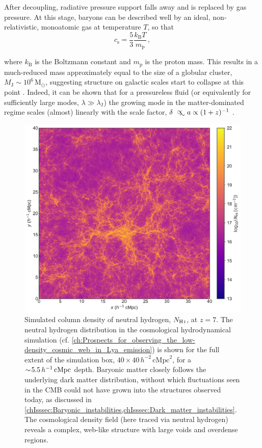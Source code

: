 After decoupling, radiative pressure support falls away and is replaced by gas pressure. At this stage, baryons can be described well by an ideal, non-relativistic, monoatomic gas at temperature $T$, so that
\begin{equation}
    \label{chIeq:Ideal_gas}
    c_\text{s} = \frac{5}{3} \frac{k_\text{B} T}{m_\text{p}} \, ,
\end{equation}

\noindent where $k_\text{B}$ is the Boltzmann constant and $m_\text{p}$ is the proton mass. This results in a much-reduced \citeauthor{1902RSPTA.199....1J} mass approximately equal to the size of a globular cluster, $M_\text{J} \sim 10^{6} \, \mathrm{M_\odot}$, suggesting structure on galactic scales start to collapse at this point \citep{2010gfe..book.....M}. Indeed, it can be shown that for a pressureless fluid (or equivalently for sufficiently large modes, $\lambda \gg \lambda_\text{J}$) the growing mode in the matter-dominated regime scales (almost) linearly with the scale factor, $\delta \appropto a \propto (1+z)^{-1}$ \citep{1992ARA&A..30..499C}.
\begin{figure}
    \centering
    \includegraphics[width=\linewidth]{"Figs/Neutral_gas_distribution"}
    \caption[Simulated column density of neutral hydrogen at $z = 7$]
    {Simulated column density of neutral hydrogen, $N_\text{\ion{H}{I}}$, at $z = 7$. The neutral hydrogen distribution in the cosmological hydrodynamical simulation (cf. \cref{ch:Prospects_for_observing_the_low-density_cosmic_web_in_Lya_emission}) is shown for the full extent of the simulation box, $40 \times 40 \, h^{-2} \, \mathrm{cMpc}^2$, for a $\sim \! 5.5 \, h^{-1} \, \mathrm{cMpc}$ depth. Baryonic matter closely follows the underlying dark matter distribution, without which fluctuations seen in the CMB could not have grown into the structures observed today, as discussed in \cref{chIsssec:Baryonic_instabilities,chIsssec:Dark_matter_instabilities}. The cosmological density field (here traced via neutral hydrogen) reveals a complex, web-like structure with large voids and overdense regions.}
    \label{chIfig:Neutral_gas_distribution}
\end{figure}

